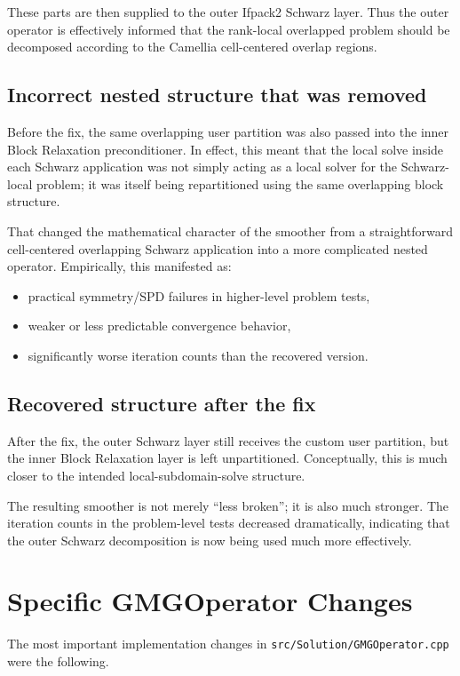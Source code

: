 \documentclass[11pt]{article}
\begin{document}
These parts are then supplied to the outer Ifpack2 Schwarz layer. Thus the outer operator is effectively informed that the rank-local overlapped problem should be decomposed according to the Camellia cell-centered overlap regions.

\subsection{Incorrect nested structure that was removed}
Before the fix, the same overlapping user partition was also passed into the inner Block Relaxation preconditioner. In effect, this meant that the local solve inside each Schwarz application was not simply acting as a local solver for the Schwarz-local problem; it was itself being repartitioned using the same overlapping block structure.

That changed the mathematical character of the smoother from a straightforward cell-centered overlapping Schwarz application into a more complicated nested operator. Empirically, this manifested as:
\begin{itemize}
  \item practical symmetry/SPD failures in higher-level problem tests,
  \item weaker or less predictable convergence behavior,
  \item significantly worse iteration counts than the recovered version.
\end{itemize}

\subsection{Recovered structure after the fix}
After the fix, the outer Schwarz layer still receives the custom user partition, but the inner Block Relaxation layer is left unpartitioned. Conceptually, this is much closer to the intended local-subdomain-solve structure.

The resulting smoother is not merely ``less broken''; it is also much stronger. The iteration counts in the problem-level tests decreased dramatically, indicating that the outer Schwarz decomposition is now being used much more effectively.

\section{Specific GMGOperator Changes}
The most important implementation changes in \texttt{src/Solution/GMGOperator.cpp} were the following.
\end{document}

